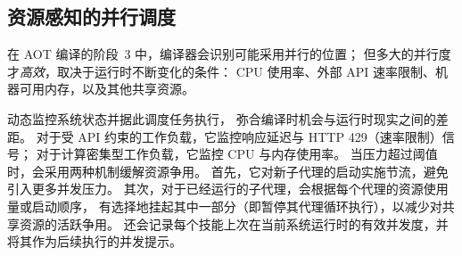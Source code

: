 \subsection{资源感知的并行调度}
\label{sec:runtime:sched}

在 AOT 编译的阶段~3 中，编译器会识别可能采用并行的位置；
但多大的并行度才\emph{高效}，取决于运行时不断变化的条件：
CPU 使用率、外部 API 速率限制、机器可用内存，以及其他共享资源。

\sys 动态监控系统状态并据此调度任务执行，
弥合编译时机会与运行时现实之间的差距。
对于受 API 约束的工作负载，它监控响应延迟与 HTTP 429（速率限制）信号；
对于计算密集型工作负载，它监控 CPU 与内存使用率。
当压力超过阈值时，\sys 会采用两种机制缓解资源争用。
首先，它对新子代理的启动实施节流，避免引入更多并发压力。
其次，对于已经运行的子代理，\sys 会根据每个代理的资源使用量或启动顺序，
有选择地挂起其中一部分（即暂停其代理循环执行），以减少对共享资源的活跃争用。
\sys 还会记录每个技能上次在当前系统运行时的有效并发度，并将其作为后续执行的并发提示。
